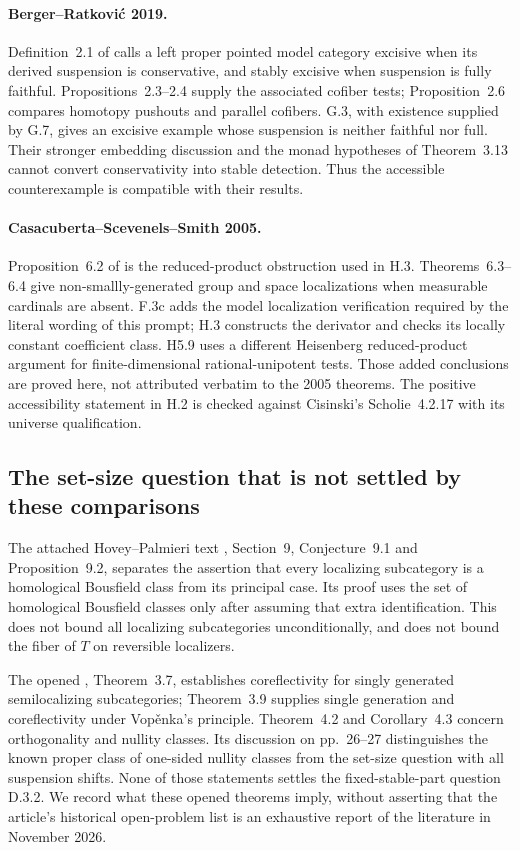 \paragraph{Berger--Ratkovi\'c 2019.}
Definition~2.1 of \cite{JBergerRatkovic2019} calls a left proper pointed model
category excisive when its derived suspension is conservative, and stably
excisive when suspension is fully faithful. Propositions~2.3--2.4 supply
the associated cofiber tests; Proposition~2.6 compares homotopy pushouts
and parallel cofibers. G.3, with existence supplied by G.7, gives an
excisive example whose suspension is neither faithful nor full.
Their stronger embedding discussion and the monad hypotheses of
Theorem~3.13 cannot convert conservativity into stable detection.
Thus the accessible counterexample is compatible with their results.

\paragraph{Casacuberta--Scevenels--Smith 2005.}
Proposition~6.2 of \cite{FGHCSS2005} is the reduced-product obstruction used
in H.3. Theorems~6.3--6.4 give non-smallly-generated group and space
localizations when measurable cardinals are absent. F.3c adds the model
localization verification required by the literal wording of this prompt;
H.3 constructs the derivator and checks its locally constant coefficient
class. H5.9 uses a different Heisenberg reduced-product argument for
finite-dimensional rational-unipotent tests. Those added conclusions are
proved here, not attributed verbatim to the 2005 theorems. The positive
accessibility statement in H.2 is checked against Cisinski's
Scholie~4.2.17 with its universe qualification.

\subsection{The set-size question that is not settled by these comparisons}

The attached Hovey--Palmieri text \cite{JHoveyPalmieri1999}, Section~9,
Conjecture~9.1 and Proposition~9.2, separates the assertion that every
localizing subcategory is a homological Bousfield class from its principal
case. Its proof uses the set of homological Bousfield classes only after
assuming that extra identification. This does not bound all localizing
subcategories unconditionally, and does not bound the fiber of $T$ on
reversible localizers.

The opened \cite{JCGR2014}, Theorem~3.7, establishes coreflectivity for
singly generated semilocalizing subcategories; Theorem~3.9 supplies single
generation and coreflectivity under Vop\v enka's principle. Theorem~4.2
and Corollary~4.3 concern orthogonality and nullity classes. Its discussion
on pp.~26--27 distinguishes the known proper class of one-sided nullity
classes from the set-size question with all suspension shifts. None of
those statements settles the fixed-stable-part question D.3.2. We record
what these opened theorems imply, without asserting that the article's
historical open-problem list is an exhaustive report of the literature
in November 2026.

